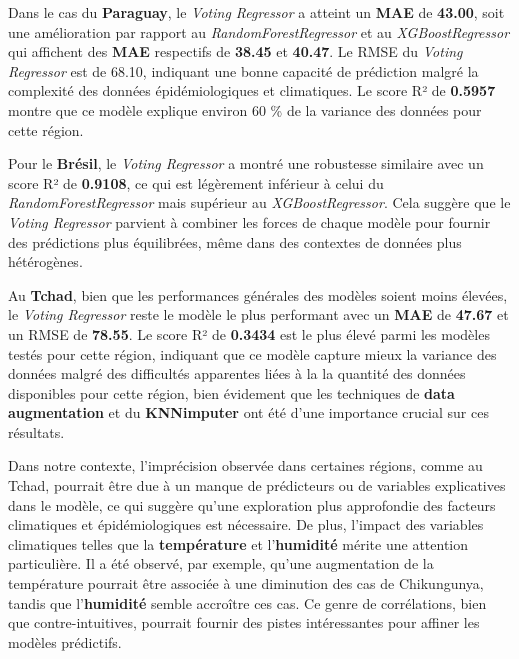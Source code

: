 Dans le cas du \textbf{Paraguay}, le \textit{Voting Regressor} a atteint un \textbf{MAE} de \textbf{43.00}, soit une amélioration par rapport au \textit{RandomForestRegressor} et au \textit{XGBoostRegressor} qui affichent des \textbf{MAE} respectifs de \textbf{38.45} et \textbf{40.47}. Le RMSE du \textit{Voting Regressor} est de 68.10, indiquant une bonne capacité de prédiction malgré la complexité des données épidémiologiques et climatiques. Le score R² de \textbf{0.5957 }montre que ce modèle explique environ 60 \% de la variance des données pour cette région.

Pour le \textbf{Brésil}, le \textit{Voting Regressor} a montré une robustesse similaire avec un score R² de \textbf{0.9108}, ce qui est légèrement inférieur à celui du \textit{RandomForestRegressor} mais supérieur au \textit{XGBoostRegressor}. Cela suggère que le \textit{Voting Regressor} parvient à combiner les forces de chaque modèle pour fournir des prédictions plus équilibrées, même dans des contextes de données plus hétérogènes.

Au \textbf{Tchad}, bien que les performances générales des modèles soient moins élevées, le \textit{Voting Regressor} reste le modèle le plus performant avec un \textbf{MAE} de \textbf{47.67} et un RMSE de \textbf{78.55}. Le score R² de \textbf{0.3434} est le plus élevé parmi les modèles testés pour cette région, indiquant que ce modèle capture mieux la variance des données malgré des difficultés apparentes liées à la la quantité des données disponibles pour cette région, bien évidement que les techniques de \textbf{data augmentation} et du \textbf{KNNimputer} ont été d'une importance crucial sur ces résultats.

Dans notre contexte, l'imprécision observée dans certaines régions, comme au Tchad, pourrait être due à un manque de prédicteurs ou de variables explicatives dans le modèle, ce qui suggère qu'une exploration plus approfondie des facteurs climatiques et épidémiologiques est nécessaire. De plus, l'impact des variables climatiques telles que la \textbf{température} et l'\textbf{humidité} mérite une attention particulière. Il a été observé, par exemple, qu'une augmentation de la température pourrait être associée à une diminution des cas de Chikungunya, tandis que l'\textbf{humidité} semble accroître ces cas. Ce genre de corrélations, bien que contre-intuitives, pourrait fournir des pistes intéressantes pour affiner les modèles prédictifs.